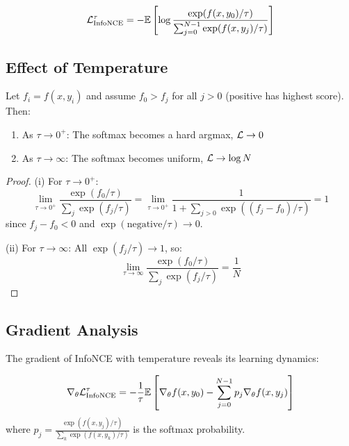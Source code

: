 \begin{notechapter}
\begin{equation}
\mathcal{L}_{\text{InfoNCE}}^\tau = -\mathbb{E}\left[\log \frac{\exp(f(x, y_0)/\tau)}{\sum_{j=0}^{N-1} \exp(f(x, y_j)/\tau)}\right]
\end{equation}

\subsection{Effect of Temperature}

\begin{proposition}
\label{contrastive-rigorous:prop:temperature}
Let $f_i = f(x, y_i)$ and assume $f_0 > f_j$ for all $j > 0$ (positive has highest score). Then:
\begin{enumerate}[label=(\roman*)]
    \item As $\tau \to 0^+$: The softmax becomes a hard argmax, $\mathcal{L} \to 0$
    \item As $\tau \to \infty$: The softmax becomes uniform, $\mathcal{L} \to \log N$
\end{enumerate}
\end{proposition}

\begin{proof}
(i) For $\tau \to 0^+$:
\begin{equation}
\lim_{\tau \to 0^+} \frac{\exp(f_0/\tau)}{\sum_j \exp(f_j/\tau)} = \lim_{\tau \to 0^+} \frac{1}{1 + \sum_{j>0} \exp((f_j - f_0)/\tau)} = 1
\end{equation}
since $f_j - f_0 < 0$ and $\exp(\text{negative}/\tau) \to 0$.

(ii) For $\tau \to \infty$: All $\exp(f_j/\tau) \to 1$, so:
\begin{equation}
\lim_{\tau \to \infty} \frac{\exp(f_0/\tau)}{\sum_j \exp(f_j/\tau)} = \frac{1}{N}
\end{equation}
\end{proof}

\subsection{Gradient Analysis}

The gradient of InfoNCE with temperature reveals its learning dynamics:

\begin{proposition}
\begin{equation}
\nabla_\theta \mathcal{L}_{\text{InfoNCE}}^\tau = -\frac{1}{\tau}\mathbb{E}\left[\nabla_\theta f(x, y_0) - \sum_{j=0}^{N-1} p_j \nabla_\theta f(x, y_j)\right]
\end{equation}
where $p_j = \frac{\exp(f(x,y_j)/\tau)}{\sum_k \exp(f(x,y_k)/\tau)}$ is the softmax probability.
\end{proposition}


\end{notechapter}
